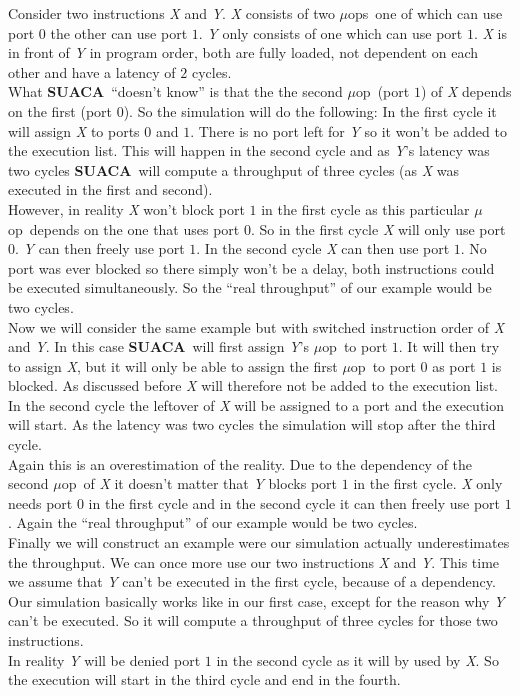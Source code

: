 \documentclass[a4paper,12pt,titlepage, twoside]{report}
\newcommand{\suaca}{\textbf{SUACA}}
\newcommand{\microop}{$\mu$op}
\newcommand{\microops}{$\mu$ops}
\begin{document}
Consider two instructions \emph{X} and \emph{Y}. \emph{X} consists of two \microops\ one of which can use port $0$ the other can use port $1$. \emph{Y} only consists of one which can use port $1$. \emph{X} is in front of \emph{Y} in program order, both are fully loaded, not dependent on each other and have a latency of $2$ cycles.\\
What \suaca\ ``doesn't know'' is that the the second \microop\ (port $1$) of \emph{X} depends on the first (port $0$). So the simulation will do the following: In the first cycle it will assign \emph{X} to ports $0$ and $1$. There is no port left for \emph{Y} so it won't be added to the execution list. This will happen in the second cycle and as \emph{Y}'s latency was two cycles \suaca\ will compute a throughput of three cycles (as \emph{X} was executed in the first and second).\\
However, in reality \emph{X} won't block port $1$ in the first cycle as this particular \microop\ depends on the one that uses port $0$. So in the first cycle \emph{X} will only use port $0$. \emph{Y} can then freely use port $1$. In the second cycle \emph{X} can then use port $1$. No port was ever blocked so there simply won't be a delay, both instructions could be executed simultaneously. So the ``real throughput'' of our example would be two cycles.\\

Now we will consider the same example but with switched instruction order of \emph{X} and \emph{Y}. In this case \suaca\ will first assign \emph{Y}'s \microop\ to port $1$. It will then try to assign \emph{X}, but it will only be able to assign the first \microop\ to port $0$ as port $1$ is blocked. As discussed before \emph{X} will therefore not be added to the execution list. In the second cycle the leftover of \emph{X} will be assigned to a port and the execution will start. As the latency was two cycles the simulation will stop after the third cycle.\\
Again this is an overestimation of the reality. Due to the dependency of the second \microop\ of \emph{X} it doesn't matter that \emph{Y} blocks port $1$ in the first cycle. \emph{X} only needs port $0$ in the first cycle and in the second cycle it can then freely use port $1$. Again the ``real throughput'' of our example would be two cycles.\\

Finally we will construct an example were our simulation actually underestimates the throughput. We can once more use our two instructions \emph{X} and \emph{Y}. This time we assume that \emph{Y} can't be executed in the first cycle, because of a dependency. Our simulation basically works like in our first case, except for the reason why \emph{Y} can't be executed. So it will compute a throughput of three cycles for those two instructions.\\
In reality \emph{Y} will be denied port $1$ in the second cycle as it will by used by \emph{X}. So the execution will start in the third cycle and end in the fourth.\\
\end{document}
